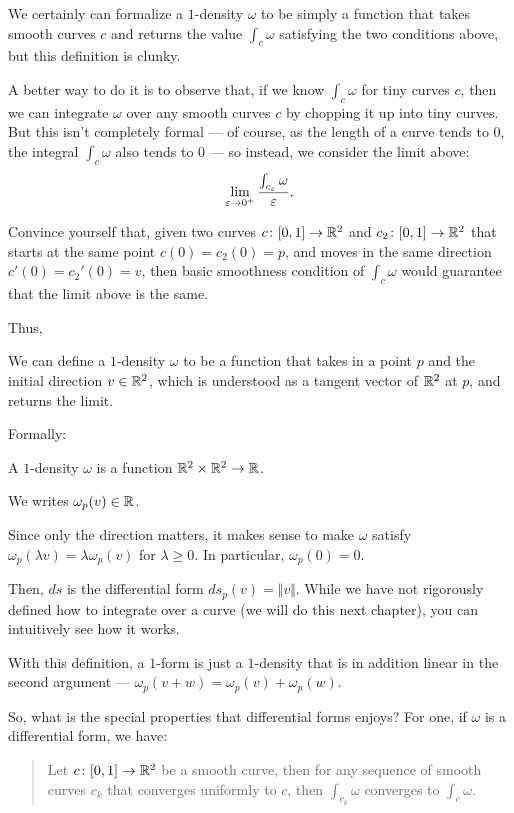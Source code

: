 We certainly can formalize a $1$-density $\omega$ to be simply a function that takes smooth curves
$c$ and returns the value $\int_c \omega$ satisfying the two conditions above, but this definition
is clunky.

A better way to do it is to observe that, if we know $\int_c \omega$ for tiny curves $c$, then we
can integrate $\omega$ over any smooth curves $c$ by chopping it up into tiny curves.
But this isn't completely formal --- of course, as the length of a curve tends to $0$, the integral
$\int_c \omega$ also tends to 0 --- so instead, we consider the limit above:
\[ \lim_{\varepsilon \to 0^+} \frac{\int_{c_\varepsilon} \omega}{\varepsilon}. \]

\begin{ques}
	Convince yourself that, given two curves $c \colon [0, 1] \to \mathbb R^2$ and $c_2 \colon [0, 1] \to
	\mathbb R^2$ that starts at the same point $c(0) = c_2(0) = p$,
	and moves in the same direction $c'(0) = c_2'(0) = v$, then basic smoothness condition of
	$\int_c \omega$ would guarantee that the limit above is the same.
\end{ques}

Thus,
\begin{moral}
We can define a $1$-density $\omega$ to be a function that takes in a point $p$ and the initial
direction $v \in \mathbb R^2$, which is understood as a tangent vector of $\mathbb R^2$ at $p$, and returns
the limit.
\end{moral}

Formally:
\begin{definition}[$1$-density]
	A $1$-density $\omega$ is a function $\mathbb R^2 \times \mathbb R^2 \to \mathbb R$.
\end{definition}
We writes $\omega_p(v) \in \mathbb R$.

Since only the direction matters, it makes sense to make $\omega$ satisfy
$\omega_p(\lambda v) = \lambda \omega_p(v)$ for $\lambda \geq 0$.  In particular, $\omega_p(0) = 0$.

Then, $ds$ is the differential form $ds_p(v) = \Vert v \Vert$. While we have not rigorously defined
how to integrate over a curve (we will do this next chapter), you can intuitively see how it works.

With this definition, a $1$-form is just a $1$-density that is in addition linear in the second
argument --- $\omega_p(v + w) = \omega_p(v) + \omega_p(w)$.

So, what is the special properties that differential forms enjoys? For one, if $\omega$ is a
differential form, we have:
\begin{quote}
	Let $c \colon [0, 1] \to \mathbb R^2$ be a smooth curve, then for any sequence of smooth curves $c_k$
	that converges uniformly to $c$, then $\int_{c_k} \omega$ converges to $\int_c \omega$.
\end{quote}


